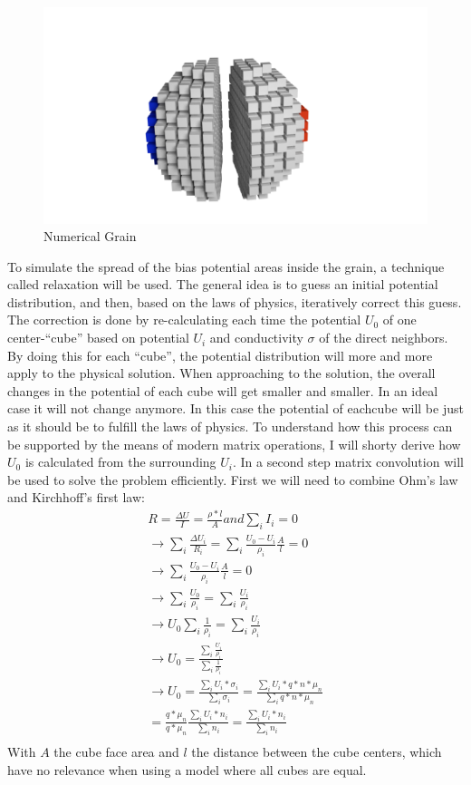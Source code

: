 \documentclass[11pt]{article}
\begin{document}
\begin{figure}
\centering
\includegraphics{media/pics/sliced_cube.png}
\caption{Numerical Grain}
\end{figure}

To simulate the spread of the bias potential areas inside the grain, a
technique called relaxation will be used. The general idea is to guess
an initial potential distribution, and then, based on the laws of
physics, iteratively correct this guess. The correction is done by
re-calculating each time the potential \(U_0\) of one center-``cube''
based on potential \(U_i\) and conductivity \(\sigma\) of the direct
neighbors. By doing this for each ``cube'', the potential distribution
will more and more apply to the physical solution. When approaching to
the solution, the overall changes in the potential of each cube will get
smaller and smaller. In an ideal case it will not change anymore. In
this case the potential of eachcube will be just as it should be to
fulfill the laws of physics. To understand how this process can be
supported by the means of modern matrix operations, I will shorty derive
how \(U_0\) is calculated from the surrounding \(U_i\). In a second step
matrix convolution will be used to solve the problem efficiently. First
we will need to combine Ohm's law and Kirchhoff's first law:
\begin{align}
R  = \frac{\Delta U}{I} = \frac{{\rho}*l}{A} and \sum_{i}I_i=0\\
\rightarrow \sum_{i}\frac{\Delta U_i}{R_i} = \sum_{i}\frac{U_0-U_i}{\rho_i}\frac{A}{l}=0\\
\rightarrow \sum_{i}\frac{U_0-U_i}{\rho_i}\frac{A}{l}=0\\
\rightarrow \sum_{i}\frac{U_0}{\rho_i}=\sum_{i}\frac{U_i}{\rho_i}\\
\rightarrow U_0\sum_{i}\frac{1}{\rho_i}=\sum_{i}\frac{U_i}{\rho_i}\\
\rightarrow U_0=\frac{\sum_{i}\frac{U_i}{\rho_i}}{\sum_{i}\frac{1}{\rho_i}}\\
\rightarrow U_0=\frac{\sum_{i}{U_i*\sigma_i}}{\sum_{i}{\sigma_i}}=\frac{\sum_{i}{U_i*q*n*\mu_n }}{\sum_{i}{q*n*\mu_n }}\\=\frac{q*\mu_n}{q*\mu_n} \frac{\sum_{i}{U_i*n_i}}{\sum_{i}{n_i}}=\frac{\sum_{i}{U_i*n_i}}{\sum_{i}{n_i}}\label{u_center}\tag{$U_0$ from $U_i$}\\
\end{align} With \(A\) the cube face area and \(l\) the distance between
the cube centers, which have no relevance when using a model where all
cubes are equal.
\end{document}
